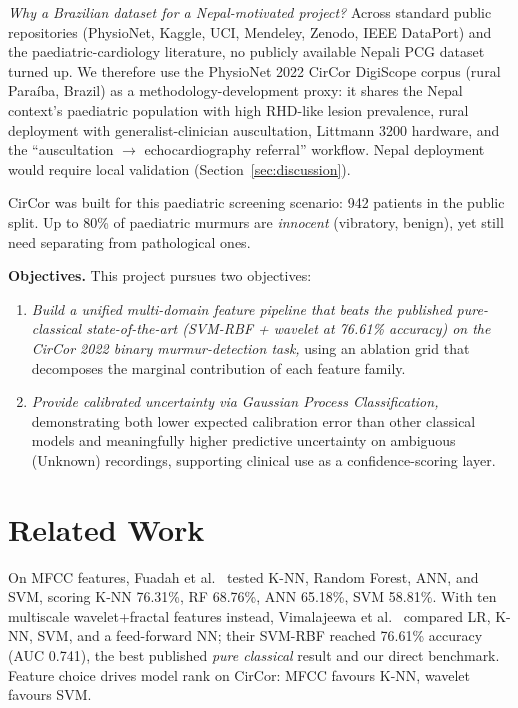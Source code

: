 \documentclass[10pt,twocolumn]{article}
\begin{document}
\textit{Why a Brazilian dataset for a Nepal-motivated project?} Across standard public repositories (PhysioNet, Kaggle, UCI, Mendeley, Zenodo, IEEE DataPort) and the paediatric-cardiology literature, no publicly available Nepali PCG dataset turned up. We therefore use the PhysioNet 2022 CirCor DigiScope corpus \citep{challenge2022, circor_data} (rural Para\'{i}ba, Brazil) as a methodology-development proxy: it shares the Nepal context's paediatric population with high RHD-like lesion prevalence, rural deployment with generalist-clinician auscultation, Littmann 3200 hardware, and the ``auscultation $\rightarrow$ echocardiography referral'' workflow. Nepal deployment would require local validation (Section~\ref{sec:discussion}).

CirCor was built for this paediatric screening scenario: 942 patients in the public split. Up to 80\% of paediatric murmurs are \textit{innocent} (vibratory, benign), yet still need separating from pathological ones.

\textbf{Objectives.} This project pursues two objectives:
\begin{enumerate}[label=\textbf{O\arabic*:}, leftmargin=*]
    \item \textit{Build a unified multi-domain feature pipeline that beats the published pure-classical state-of-the-art (SVM-RBF + wavelet at 76.61\% accuracy) on the CirCor 2022 binary murmur-detection task,} using an ablation grid that decomposes the marginal contribution of each feature family.
    \item \textit{Provide calibrated uncertainty via Gaussian Process Classification,} demonstrating both lower expected calibration error than other classical models and meaningfully higher predictive uncertainty on ambiguous (Unknown) recordings, supporting clinical use as a confidence-scoring layer.
\end{enumerate}

\section{Related Work}

On MFCC features, Fuadah et al.\ \citep{fuadah2023} tested K-NN, Random Forest, ANN, and SVM, scoring K-NN 76.31\%, RF 68.76\%, ANN 65.18\%, SVM 58.81\%. With ten multiscale wavelet+fractal features instead, Vimalajeewa et al.\ \citep{wavelet2025} compared LR, K-NN, SVM, and a feed-forward NN; their SVM-RBF reached 76.61\% accuracy (AUC 0.741), the best published \textit{pure classical} result and our direct benchmark. Feature choice drives model rank on CirCor: MFCC favours K-NN, wavelet favours SVM.
\end{document}
